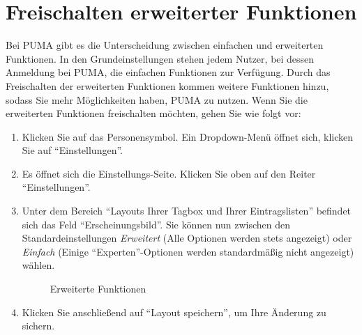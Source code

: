 \section{Freischalten erweiterter Funktionen}
Bei PUMA gibt es die Unterscheidung zwischen einfachen und erweiterten Funktionen. In den Grundeinstellungen stehen jedem Nutzer, bei dessen Anmeldung bei PUMA, die einfachen Funktionen zur Verfügung. Durch das Freischalten der erweiterten Funktionen kommen weitere Funktionen hinzu, sodass Sie mehr Möglichkeiten haben, PUMA zu nutzen.  Wenn Sie die erweiterten Funktionen freischalten möchten, gehen Sie wie folgt vor:
\begin{enumerate}
    \item Klicken Sie auf das Personensymbol. Ein Dropdown-Menü öffnet sich, klicken Sie auf \enquote{Einstellungen}.
    \item Es öffnet sich die Einstellungs-Seite. Klicken Sie oben auf den Reiter \enquote{Einstellungen}.
    \item Unter dem Bereich \enquote{Layouts Ihrer Tagbox und Ihrer Eintragslisten} befindet sich das Feld \enquote{Erscheinungsbild}. Sie können nun zwischen den Standardeinstellungen \textit{Erweitert} (Alle Optionen werden stets angezeigt) oder \textit{Einfach} (Einige \enquote{Experten}-Optionen werden standardmäßig nicht angezeigt) wählen.
    \begin{figure}[h!]
 \centering
 \caption{Erweiterte Funktionen}
 \label{figure024}
\end{figure} 
    \item Klicken Sie anschließend auf \enquote{Layout speichern}, um Ihre Änderung zu sichern.
\end{enumerate}